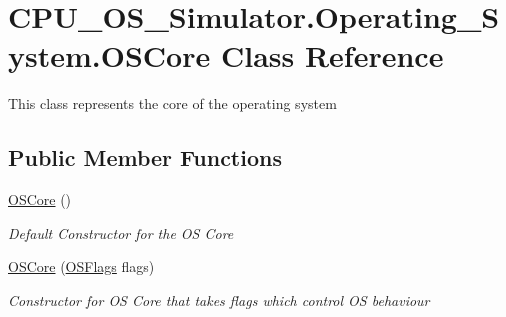 \hypertarget{class_c_p_u___o_s___simulator_1_1_operating___system_1_1_o_s_core}{}\section{C\+P\+U\+\_\+\+O\+S\+\_\+\+Simulator.\+Operating\+\_\+\+System.\+O\+S\+Core Class Reference}
\label{class_c_p_u___o_s___simulator_1_1_operating___system_1_1_o_s_core}


This class represents the core of the operating system  


\subsection*{Public Member Functions}
\begin{DoxyCompactItemize}
\item 
\hyperlink{class_c_p_u___o_s___simulator_1_1_operating___system_1_1_o_s_core_a3845ed83851b87e64d6918a2a495e45e}{O\+S\+Core} ()
\begin{DoxyCompactList}\small\item\em Default Constructor for the O\+S Core \end{DoxyCompactList}\item 
\hyperlink{class_c_p_u___o_s___simulator_1_1_operating___system_1_1_o_s_core_a65c809ada2e4d0d5f6269e6a9009db0d}{O\+S\+Core} (\hyperlink{struct_c_p_u___o_s___simulator_1_1_operating___system_1_1_o_s_flags}{O\+S\+Flags} flags)
\begin{DoxyCompactList}\small\item\em Constructor for O\+S Core that takes flags which control O\+S behaviour \end{DoxyCompactList}\end{DoxyCompactItemize}
